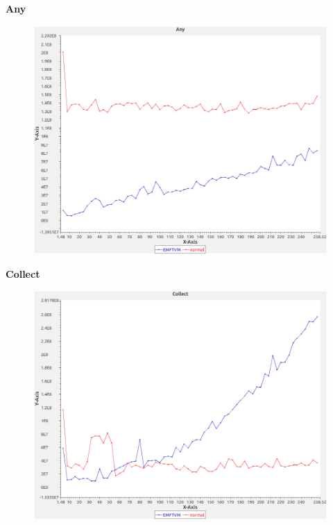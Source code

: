 \noindent\textbf{Any}

\begin{figure}[h]
\centering
\includegraphics[width=\textwidth]{../graphs/set/Any}
\end{figure}
\pagebreak

\noindent\textbf{Collect}

\begin{figure}[h]
\centering
\includegraphics[width=\textwidth]{../graphs/set/Collect}
\end{figure}
\pagebreak

